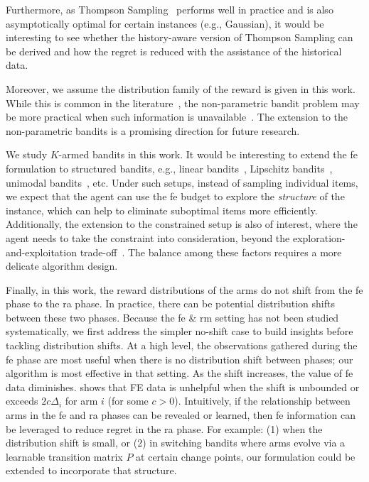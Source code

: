 \documentclass[twoside,11pt]{article}
\begin{document}
Furthermore,
as Thompson Sampling~\citep{agrawal2017near} performs well in practice and is also asymptotically optimal for certain instances (e.g., Gaussian), it would be interesting to see whether the history-aware version of Thompson Sampling can be derived and how the regret is reduced with the assistance of the historical data.

Moreover,
we assume the distribution family of the reward is given in this work. While this is common in the literature~\citep{kaufmann2016complexity,garivier2011KLUCB,garivier2016optimal}, the non-parametric bandit problem may be more practical when such information is unavailable~\citep{Riou2020bandit}. The extension to the non-parametric bandits is a promising direction for future research.

We study $K$-armed bandits  in this work. It would be interesting to extend the \ac{fe} formulation to structured bandits, e.g., linear bandits~\citep{Abbasi2011improved}, Lipschitz bandits~\citep{magureanu2014lipschitz}, unimodal bandits~\citep{yu2011unimodal,Combes2014unimodal}, etc.
Under such setups, instead of sampling individual items, we expect that the agent can use the \ac{fe} budget to explore the \emph{structure} of the instance, which can help to   eliminate suboptimal items more efficiently. Additionally, the extension to the constrained setup is also of interest, where the agent needs to take the constraint into consideration, beyond the exploration-and-exploitation trade-off~\citep{Amani2019Linear,hou2024probably}. The balance among these factors  requires a more delicate algorithm design.

Finally, in this work, the reward distributions of the arms do not shift from the \ac{fe} phase to the \ac{ra} phase. In practice, there can be potential distribution shifts between these two phases. Because the \ac{fe} \& \ac{rm} setting has not been studied systematically, we first address the simpler no-shift case to build insights before tackling distribution shifts.
At a high level, the observations gathered during the \ac{fe} phase are most useful when there is no distribution shift between phases; our algorithm is most effective in that setting. As the shift increases, the value of \ac{fe} data diminishes. \citet{cheung2024leveraging} shows that FE data is unhelpful when the shift is unbounded or exceeds $2c\Delta_i$ for arm $i$ (for some $c>0$). Intuitively, if the relationship between arms in the \ac{fe} and \ac{ra} phases can be revealed or learned, then \ac{fe} information can be leveraged to reduce regret in the \ac{ra} phase. For example: (1) when the distribution shift is small, or (2) in switching bandits where arms evolve via a learnable transition matrix $P$ at certain change points, our formulation could be extended to incorporate that structure. 
\end{document}
